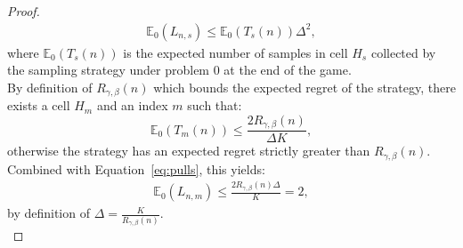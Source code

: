 \documentclass[final,12pt]{colt2018}
\begin{document}
\begin{proof}
\begin{eqnarray}\label{eq:pulls}
\mathbb E_0(L_{n,s}) \leq \mathbb E_0(T_s(n)) \Delta^2,
\end{eqnarray}
where $\mathbb E_0(T_s(n))$ is the expected number of samples in cell $H_s$ collected by the sampling strategy under problem $0$ at the end of the game.\\
By definition of $R_{\gamma,\beta}(n)$ which bounds the expected regret of the strategy, there exists a cell $H_m$ and an index $m$ such that: 
$$\mathbb E_0(T_m(n)) \leq \frac{2R_{\gamma,\beta}(n)}{\Delta K},$$
otherwise the strategy has an expected regret strictly greater than $R_{\gamma,\beta}(n)$. Combined with Equation~\eqref{eq:pulls}, this yields:
\begin{eqnarray*}
\mathbb E_0(L_{n,m}) \leq \frac{2R_{\gamma,\beta}(n)\Delta}{K} = 2,
\end{eqnarray*}
by definition of $\Delta = \frac{K}{R_{\gamma,\beta}(n)}$.\\


\end{proof}
\end{document}
